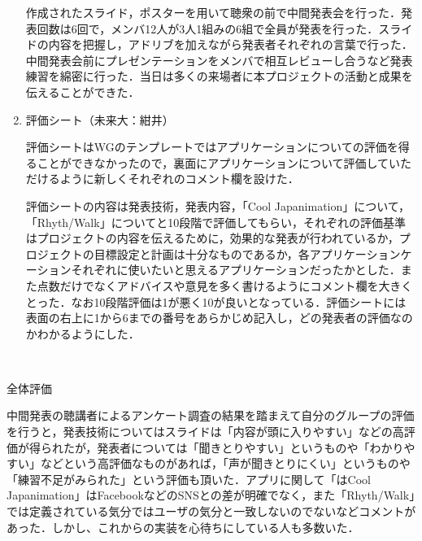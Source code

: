 \begin{enumerate}
作成されたスライド，ポスターを用いて聴衆の前で中間発表会を行った．発表回数は6回で，メンバ12人が3人1組みの6組で全員が発表を行った．スライドの内容を把握し，アドリブを加えながら発表者それぞれの言葉で行った．中間発表会前にプレゼンテーションをメンバで相互レビューし合うなど発表練習を綿密に行った．当日は多くの来場者に本プロジェクトの活動と成果を伝えることができた．
\item 評価シート（未来大：紺井）
\par
評価シートはWGのテンプレートではアプリケーションについての評価を得ることができなかったので，裏面にアプリケーションについて評価していただけるように新しくそれぞれのコメント欄を設けた．
\par 評価シートの内容は発表技術，発表内容，「Cool Japanimation」について，「Rhyth/Walk」についてと10段階で評価してもらい，それぞれの評価基準はプロジェクトの内容を伝えるために，効果的な発表が行われているか，プロジェクトの目標設定と計画は十分なものであるか，各アプリケーションケーションそれぞれに使いたいと思えるアプリケーションだったかとした．また点数だけでなくアドバイスや意見を多く書けるようにコメント欄を大きくとった．なお10段階評価は1が悪く10が良いとなっている．評価シートには表面の右上に1から6までの番号をあらかじめ記入し，どの発表者の評価なのかわかるようにした．
\end{enumerate}　
\par
全体評価
\par
中間発表の聴講者によるアンケート調査の結果を踏まえて自分のグループの評価を行うと，発表技術についてはスライドは「内容が頭に入りやすい」などの高評価が得られたが，発表者については「聞きとりやすい」というものや「わかりやすい」などという高評価なものがあれば，「声が聞きとりにくい」というものや「練習不足がみられた」という評価も頂いた．アプリに関して「はCool Japanimation」はFacebookなどのSNSとの差が明確でなく，また「Rhyth/Walk」では定義されている気分ではユーザの気分と一致しないのでないなどコメントがあった．しかし、これからの実装を心待ちにしている人も多数いた．
